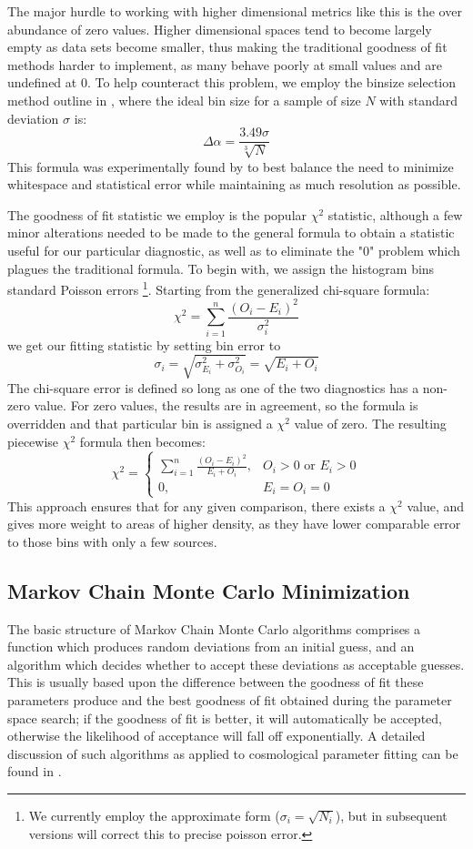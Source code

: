 \documentclass[twocolumn,letterpaper,10pt]{article}
\begin{document}
The major hurdle to working with higher dimensional metrics like this is the over abundance of zero values. Higher dimensional spaces tend to become largely empty as data sets become smaller, thus making the traditional goodness of fit methods harder to implement, as many behave poorly at small values and are undefined at 0. To help counteract this problem, we employ the binsize selection method outline in \citet{binsize}, where the ideal bin size for a sample of size $N$ with standard deviation $\sigma$ is: 
$$
\Delta \alpha=\frac{3.49\sigma}{\sqrt[3]{N}}$$
 This formula was experimentally found by \citet{binsize} to best balance the need to minimize whitespace and statistical error while maintaining as much resolution as possible.

The goodness of fit statistic we employ is the popular $\chi^2$ statistic, although a few minor alterations needed to be made to the general formula to obtain a statistic useful for our particular diagnostic, as well as to eliminate the "0" problem which plagues the traditional formula. To begin with, we assign the histogram bins standard Poisson errors \footnote{We currently employ the approximate form ($\sigma_i=\sqrt{N_i}$), but in subsequent versions will correct this to precise poisson error.}. Starting from the generalized chi-square formula:
$$
\chi^2=\sum\limits_{i=1}^n \frac{(O_i-E_i)^2}{\sigma_i^2}
$$
we get our fitting statistic by setting bin error to 
$$
\sigma_i=\sqrt{\sigma_{E_i}^2+\sigma_{O_i}^2}=\sqrt{E_i+O_i}
$$ 
The chi-square error is defined so long as one of the two diagnostics has a non-zero value. For zero values, the results are in agreement, so the formula is overridden and that particular bin is assigned a $\chi^2$ value of zero. The resulting piecewise $\chi^2$ formula then becomes:
$$
\chi^2=
\begin{cases}
\sum\limits_{i=1}^n \frac{(O_i-E_i)^2}{E_i+O_i}, & O_i > 0 \text{ or } E_i > 0 \\
0, & E_i=O_i=0
\end{cases}
$$
This approach ensures that for any given comparison, there exists a $\chi^2$ value, and gives more weight to areas of higher density, as they have lower comparable error to those bins with only a few sources.

\subsection{Markov Chain Monte Carlo Minimization}

The basic structure of Markov Chain Monte Carlo algorithms comprises a function which produces random deviations from an initial guess, and an algorithm which decides whether to accept these deviations as acceptable guesses. This is usually based upon the difference between the goodness of fit these parameters produce and the best goodness of fit obtained during the parameter space search; if the goodness of fit is better, it will automatically be accepted, otherwise the likelihood of acceptance will fall off exponentially. A detailed discussion of such algorithms as applied to cosmological parameter fitting can be found in \citet{dunkley05}.
\end{document}
